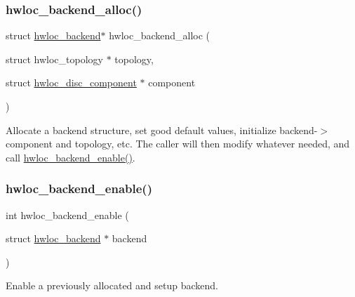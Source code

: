 \subsubsection{\texorpdfstring{hwloc\+\_\+backend\+\_\+alloc()}{hwloc\_backend\_alloc()}}
{\footnotesize\ttfamily struct \hyperlink{a00374}{hwloc\+\_\+backend}$\ast$ hwloc\+\_\+backend\+\_\+alloc (\begin{DoxyParamCaption}\item[{struct hwloc\+\_\+topology $\ast$}]{topology,  }\item[{struct \hyperlink{a00366}{hwloc\+\_\+disc\+\_\+component} $\ast$}]{component }\end{DoxyParamCaption})}



Allocate a backend structure, set good default values, initialize backend-\/$>$component and topology, etc. The caller will then modify whatever needed, and call \hyperlink{a00228_ga4715779d7191833e9b1a7490989a7497}{hwloc\+\_\+backend\+\_\+enable()}. 

\mbox{\label{a00228_ga4715779d7191833e9b1a7490989a7497}} 
\subsubsection{\texorpdfstring{hwloc\+\_\+backend\+\_\+enable()}{hwloc\_backend\_enable()}}
{\footnotesize\ttfamily int hwloc\+\_\+backend\+\_\+enable (\begin{DoxyParamCaption}\item[{struct \hyperlink{a00374}{hwloc\+\_\+backend} $\ast$}]{backend }\end{DoxyParamCaption})}



Enable a previously allocated and setup backend. 

